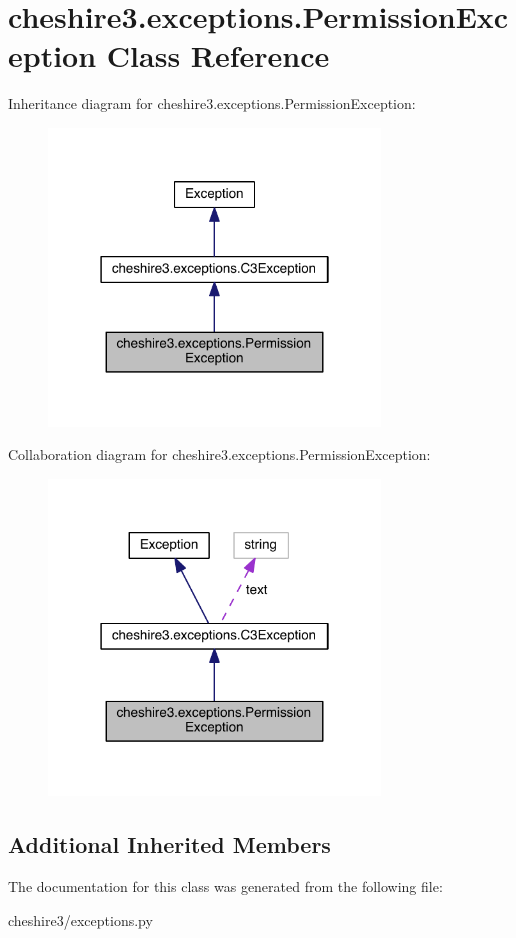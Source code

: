 \hypertarget{classcheshire3_1_1exceptions_1_1_permission_exception}{\section{cheshire3.\-exceptions.\-Permission\-Exception Class Reference}
\label{classcheshire3_1_1exceptions_1_1_permission_exception}
}


Inheritance diagram for cheshire3.\-exceptions.\-Permission\-Exception\-:
\nopagebreak
\begin{figure}[H]
\begin{center}
\leavevmode
\includegraphics[width=250pt]{classcheshire3_1_1exceptions_1_1_permission_exception__inherit__graph}
\end{center}
\end{figure}


Collaboration diagram for cheshire3.\-exceptions.\-Permission\-Exception\-:
\nopagebreak
\begin{figure}[H]
\begin{center}
\leavevmode
\includegraphics[width=250pt]{classcheshire3_1_1exceptions_1_1_permission_exception__coll__graph}
\end{center}
\end{figure}
\subsection*{Additional Inherited Members}


The documentation for this class was generated from the following file\-:\begin{DoxyCompactItemize}
\item 
cheshire3/exceptions.\-py\end{DoxyCompactItemize}
